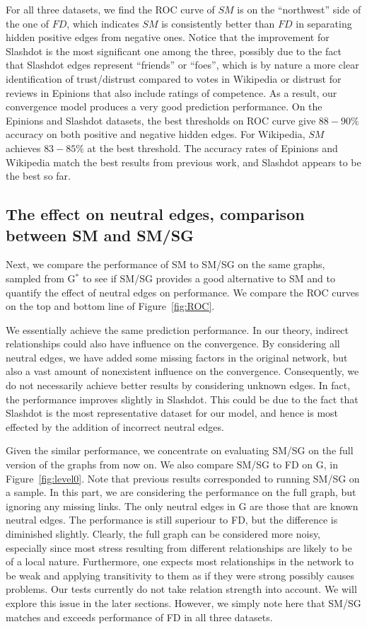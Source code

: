 \documentclass[acmtweb]{acmsmall}
\begin{document}
For all three datasets, we find the ROC curve of $SM$ is on the
``northwest'' side of the one of $FD$, which indicates $SM$ is
consistently better than $FD$ in separating hidden positive edges from
negative ones. Notice that the improvement for Slashdot is the most
significant one among the three, possibly due to the fact that
Slashdot edges represent ``friends'' or ``foes'', which is by nature a
more clear identification of trust/distrust compared to votes in
Wikipedia or distrust for reviews in Epinions that also include
ratings of competence.  As a result, our convergence model produces a
very good prediction performance.  On the Epinions and Slashdot
datasets, the best thresholds on ROC curve give $88-90 \%$ accuracy on
both positive and negative hidden edges. For Wikipedia, $SM$ achieves
$83-85 \%$ at the best threshold. The accuracy rates of Epinions and
Wikipedia match the best results from previous work, and Slashdot
appears to be the best so far.


\subsection{The effect on neutral edges, comparison between SM and SM/SG} \label{sec:neutral_edges}
Next, we compare the performance of SM to SM/SG on the same graphs,
sampled from G$^*$ to see if SM/SG provides a good alternative to SM
and to quantify the effect of neutral edges on performance. We compare
the ROC curves on the top and bottom line of Figure~\ref{fig:ROC}.

We essentially achieve the same prediction performance. In our
theory, indirect relationships could also have influence on the
convergence. By considering all neutral edges, we have added some
missing factors in the original network, but also a vast amount of
nonexistent influence on the convergence. Consequently, we do not
necessarily achieve better results by considering unknown edges. In
fact, the performance improves slightly in Slashdot. This could be due
to the fact that Slashdot is the most representative dataset for our
model, and hence is most effected by the addition of incorrect neutral
edges.

Given the similar performance, we concentrate on evaluating SM/SG on
the full version of the graphs from now on. We also compare SM/SG to
FD on G, in Figure~\ref{fig:level0}. Note that previous results
corresponded to running SM/SG on a sample. In this part, we
are considering the performance on the full graph, but ignoring any
missing links. The only neutral edges in G are those that are known
neutral edges. The performance is still superiour to FD, but the
difference is diminished slightly. Clearly, the full graph can be
considered more noisy, especially since most stress resulting from
different relationships are likely to be of a local
nature. Furthermore, one expects most relationships in the network to
be weak and applying transitivity to them as if they were strong
possibly causes problems.  Our tests currently do not take relation
strength into account. We will explore this issue in the later
sections. However, we simply note here that SM/SG matches and exceeds
performance of FD in all three datasets.
\end{document}
